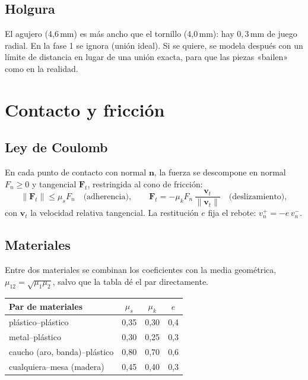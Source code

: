 \documentclass[11pt,a4paper]{article}
\numberwithin{equation}{section}
\newcommand{\vect}[1]{\bm{#1}}
\begin{document}
\subsection{Holgura}
El agujero (4{,}6\,mm) es más ancho que el tornillo (4{,}0\,mm): hay $0{,}3$\,mm de juego radial. En la fase 1 se
ignora (unión ideal). Si se quiere, se modela después con un límite de distancia en lugar de una unión exacta, para
que las piezas «bailen» como en la realidad.

\section{Contacto y fricción}

\subsection{Ley de Coulomb}
En cada punto de contacto con normal $\vect{n}$, la fuerza se descompone en normal $F_n\ge 0$ y tangencial
$\vect{F}_t$, restringida al cono de fricción:
\begin{equation}
  \lVert\vect{F}_t\rVert \le \mu_s F_n \quad\text{(adherencia)}, \qquad
  \vect{F}_t = -\mu_k F_n\,\frac{\vect{v}_t}{\lVert\vect{v}_t\rVert} \quad\text{(deslizamiento)},
\end{equation}
con $\vect{v}_t$ la velocidad relativa tangencial. La restitución $e$ fija el rebote:
$v_n^{+} = -e\,v_n^{-}$.

\subsection{Materiales}
Entre dos materiales se combinan los coeficientes con la media geométrica, $\mu_{12} = \sqrt{\mu_1\mu_2}$, salvo que la
tabla dé el par directamente.

\begin{tabularx}{\linewidth}{@{}Y c c c@{}}
\toprule
\textbf{Par de materiales} & $\mu_s$ & $\mu_k$ & $e$\\
\midrule
plástico–plástico & 0,35 & 0,30 & 0,4\\
metal–plástico & 0,30 & 0,25 & 0,3\\
caucho (aro, banda)–plástico & 0,80 & 0,70 & 0,6\\
cualquiera–mesa (madera) & 0,45 & 0,40 & 0,3\\
\bottomrule
\end{tabularx}
\end{document}
